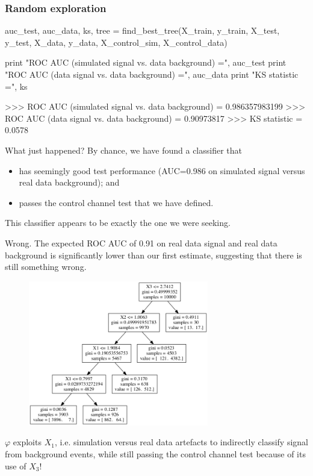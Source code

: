 \documentclass{beamer}
\begin{document}
\begin{frame}[fragile]
  \frametitle{Random exploration}

{\scriptsize
\begin{pythoncode}
auc_test, auc_data, ks, tree = find_best_tree(X_train, y_train,
                                              X_test, y_test,
                                              X_data, y_data,
                                              X_control_sim, X_control_data)

print "ROC AUC (simulated signal vs. data background) =", auc_test
print "ROC AUC (data signal vs. data background) =", auc_data
print "KS statistic =", ks

>>> ROC AUC (simulated signal vs. data background) = 0.986357983199
>>> ROC AUC (data signal vs. data background) = 0.90973817
>>> KS statistic = 0.0578
\end{pythoncode}
}

\end{frame}

\begin{frame}
What just happened? By chance, we have found a classifier that
\begin{itemize}
\item has seemingly good test performance (AUC=0.986 on simulated signal versus real data background); and
\item passes the control channel test that we have defined.
\end{itemize}
{\color{blue} This classifier appears to be exactly the one we were seeking}.
\vspace{1cm}

{\color{red}Wrong}. The expected ROC AUC of 0.91 on real data signal and real data
background is significantly lower than our first estimate, suggesting that
there is still something wrong.

\end{frame}

\begin{frame}
\begin{figure}
\centering
\includegraphics[width=0.7\textwidth]{tree.png}
\end{figure}

$\varphi$ exploits $X_1$, i.e. simulation versus real data
artefacts to indirectly classify signal from background events, {\color{red}while still passing the
control channel test} because of its use of $X_3$!

\end{frame}
\end{document}
